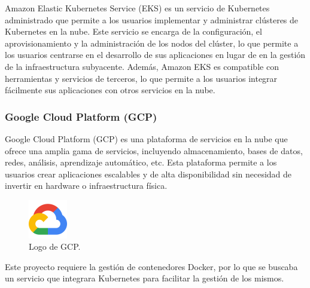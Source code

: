                     Amazon Elastic Kubernetes Service (EKS) es un servicio de Kubernetes administrado que permite a los usuarios implementar y administrar clústeres de Kubernetes en la nube. Este servicio se encarga de la configuración, el aprovisionamiento y la administración de los nodos del clúster, lo que permite a los usuarios centrarse en el desarrollo de sus aplicaciones en lugar de en la gestión de la infraestructura subyacente. Además, Amazon EKS es compatible con herramientas y servicios de terceros, lo que permite a los usuarios integrar fácilmente sus aplicaciones con otros servicios en la nube.

            \subsubsection{Google Cloud Platform (GCP)}

                Google Cloud Platform (GCP) es una plataforma de servicios en la nube que ofrece una amplia gama de servicios, incluyendo almacenamiento, bases de datos, redes, análisis, aprendizaje automático, etc. Esta plataforma permite a los usuarios crear aplicaciones escalables y de alta disponibilidad sin necesidad de invertir en hardware o infraestructura física.

                \begin{figure}[htbp!]
                    \centering

                    \includegraphics[width=0.15\textwidth]{images/Logos/gcp.png}
                    \caption{Logo de GCP.}

                    \label{fig:gcp-logo}
                \end{figure}

                Este proyecto requiere la gestión de contenedores Docker, por lo que se buscaba un servicio que integrara Kubernetes para facilitar la gestión de los mismos.

                
                
